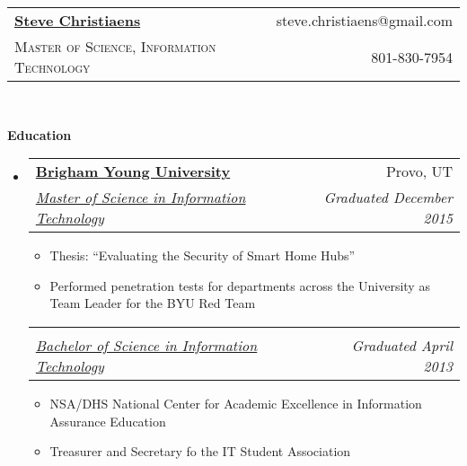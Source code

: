 \documentclass[letterpaper,11pt]{article}
\makeatletter
\newcommand{\resitem}[1]{\item #1 \vspace{-2pt}}
\newcommand{\resheading}[1]{{\large \colorbox{mygrey}{\begin{minipage}{\textwidth}{\textbf{#1 \vphantom{p\^{E}}}}\end{minipage}}}}
\newcommand{\ressubheading}[4]{
\begin{tabular*}{6.5in}{l@{\extracolsep{\fill}}r}
		\textbf{#1} & #2 \\
		\textit{#3} & \textit{#4} \\
\end{tabular*}\vspace{-6pt}}
\makeatother
\begin{document}
\newcommand{\mywebheader}{
\begin{tabular*}{7in}{l@{\extracolsep{\fill}}r}
	\textbf{\href{}{\LARGE Steve Christiaens}} & %
	{steve.christiaens@gmail.com}\\
	{\footnotesize \textsc{Master of Science, Information Technology}} & {801-830-7954} \\
	\end{tabular*}
\\
\vspace{0.1in}}

\mywebheader
\begin{comment}
	Consider adding a "QUALIFICATIONS" sections
\end{comment}
\resheading{Education}
	\begin{itemize}
		\item
			\ressubheading{\href{}{Brigham Young University}}{Provo, UT}{\href{}{Master of Science in Information Technology} \href{}{}}{Graduated December 2015}
			{ \footnotesize
				\begin{itemize}
					\resitem{Thesis: ``Evaluating the Security of Smart Home Hubs''}
					\resitem{Performed penetration tests for departments across the University as Team Leader for the BYU Red Team} 
				\end{itemize}
			}				
			\vspace{-15pt} %
			\ressubheading{\href{}{}}{}{\href{}{Bachelor of Science in Information Technology}\href{}{}}{Graduated April 2013}
				{ \footnotesize
					\begin{itemize}
						\resitem{NSA/DHS National Center for Academic Excellence in Information Assurance Education}
						\resitem{Treasurer and Secretary fo the IT Student Association} 
					\end{itemize}
				}
	\end{itemize} %
\end{document}
